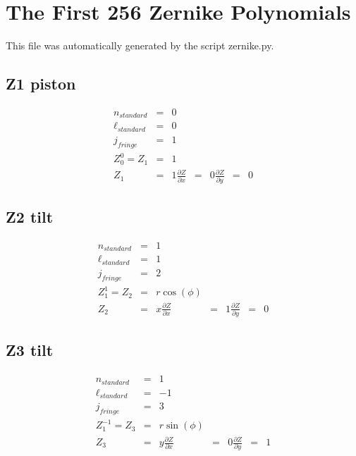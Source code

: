 \documentclass[10pt]{article}
\begin{document}
\section{The First 256 Zernike Polynomials}
This file was automatically generated by the script zernike.py.
  \subsection{Z1 piston}
    \begin{subequations}
    \begin{eqnarray}
        n_{standard} &=&0\\
        \ell_{standard} &=&0\\
        j_{fringe} &=&1\\
        Z_{0}^{0} = Z_{1} &=& 1\\
        Z_{1} &=& 1
        \frac{\partial Z}{\partial x} &=& 0
        \frac{\partial Z}{\partial y} &=& 0
    \end{eqnarray}
    \end{subequations}
  \subsection{Z2 tilt}
    \begin{subequations}
    \begin{eqnarray}
        n_{standard} &=&1\\
        \ell_{standard} &=&1\\
        j_{fringe} &=&2\\
        Z_{1}^{1} = Z_{2} &=& r \cos{\left(\phi \right)}\\
        Z_{2} &=& x
        \frac{\partial Z}{\partial x} &=& 1
        \frac{\partial Z}{\partial y} &=& 0
    \end{eqnarray}
    \end{subequations}
  \subsection{Z3 tilt}
    \begin{subequations}
    \begin{eqnarray}
        n_{standard} &=&1\\
        \ell_{standard} &=&-1\\
        j_{fringe} &=&3\\
        Z_{1}^{-1} = Z_{3} &=& r \sin{\left(\phi \right)}\\
        Z_{3} &=& y
        \frac{\partial Z}{\partial x} &=& 0
        \frac{\partial Z}{\partial y} &=& 1
    \end{eqnarray}
    \end{subequations}
\end{document}
